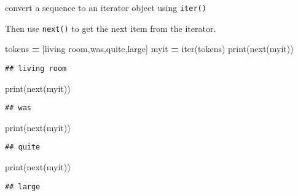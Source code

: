 \documentclass[
]{book}
\newenvironment{Shaded}{\begin{snugshade}}{\end{snugshade}}
\newcommand{\BuiltInTok}[1]{#1}
\newcommand{\NormalTok}[1]{#1}
\newcommand{\OperatorTok}[1]{\textcolor[rgb]{0.81,0.36,0.00}{\textbf{#1}}}
\newcommand{\StringTok}[1]{\textcolor[rgb]{0.31,0.60,0.02}{#1}}
\begin{document}
convert a sequence to an iterator object using \texttt{iter()}

Then use \texttt{next()} to get the next item from the iterator.

\begin{Shaded}
\begin{Highlighting}[]
\NormalTok{tokens }\OperatorTok{=}\NormalTok{ [}\StringTok{\textquotesingle{}living room\textquotesingle{}}\NormalTok{,}\StringTok{\textquotesingle{}was\textquotesingle{}}\NormalTok{,}\StringTok{\textquotesingle{}quite\textquotesingle{}}\NormalTok{,}\StringTok{\textquotesingle{}large\textquotesingle{}}\NormalTok{]}
\NormalTok{myit }\OperatorTok{=} \BuiltInTok{iter}\NormalTok{(tokens)}
\BuiltInTok{print}\NormalTok{(}\BuiltInTok{next}\NormalTok{(myit)) }
\end{Highlighting}
\end{Shaded}

\begin{verbatim}
## living room
\end{verbatim}

\begin{Shaded}
\begin{Highlighting}[]
\BuiltInTok{print}\NormalTok{(}\BuiltInTok{next}\NormalTok{(myit)) }
\end{Highlighting}
\end{Shaded}

\begin{verbatim}
## was
\end{verbatim}

\begin{Shaded}
\begin{Highlighting}[]
\BuiltInTok{print}\NormalTok{(}\BuiltInTok{next}\NormalTok{(myit)) }
\end{Highlighting}
\end{Shaded}

\begin{verbatim}
## quite
\end{verbatim}

\begin{Shaded}
\begin{Highlighting}[]
\BuiltInTok{print}\NormalTok{(}\BuiltInTok{next}\NormalTok{(myit)) }
\end{Highlighting}
\end{Shaded}

\begin{verbatim}
## large
\end{verbatim}
\end{document}
